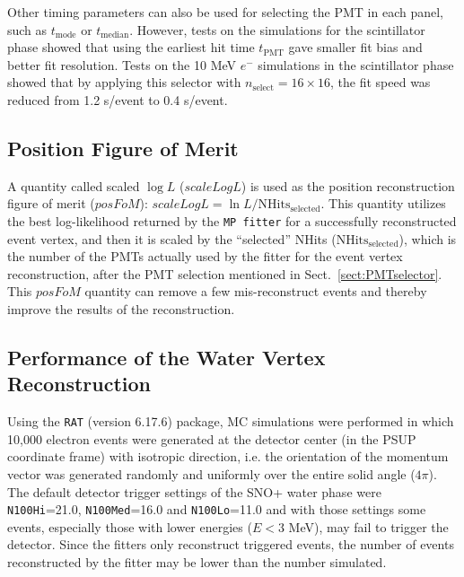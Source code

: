 \begin{itemize}
	Other timing parameters can also be used for selecting the PMT in each panel, such as $t_\mathrm{mode}$ or $t_\mathrm{median}$. However, tests on the simulations for the scintillator phase showed that using the earliest hit time $t_\mathrm{PMT}$ gave smaller fit bias and better fit resolution. Tests on the 10 MeV $e^-$ simulations in the scintillator phase showed that by applying this selector with $n_\mathrm{select}=16\times16$, the fit speed was reduced from 1.2 s/event to 0.4 s/event.
\end{itemize}

\subsection{Position Figure of Merit}\label{sect:positionFoM}

A quantity called scaled $\log L$ ($scaleLogL$) is used as the position reconstruction figure of merit ($posFoM$): $scaleLogL = \ln L/\mathrm{NHits}_\mathrm{selected}$. This quantity utilizes the best log-likelihood returned by the \texttt{MP fitter} for a successfully reconstructed event vertex, and then it is scaled by the ``selected'' NHits ($\mathrm{NHits}_\mathrm{selected}$), which is the number of the PMTs actually used by the fitter for the event vertex reconstruction, after the PMT selection mentioned in Sect.~\ref{sect:PMTselector}. This $posFoM$ quantity can remove a few mis-reconstruct events and thereby improve the results of the reconstruction.

\subsection{Performance of the Water Vertex Reconstruction}\label{sect:waterFitterVertex}

Using the \texttt{RAT} (version 6.17.6) package, MC simulations were performed in which 10,000 electron events were generated at the detector center (in the PSUP coordinate frame) with isotropic direction, i.e. the orientation of the momentum vector was generated randomly and uniformly over the entire solid angle ($4\pi$). The default detector trigger settings of the SNO+ water phase were \texttt{N100Hi}=21.0, \texttt{N100Med}=16.0 and \texttt{N100Lo}=11.0 and with those settings some events, especially those with lower energies ($E<3$ MeV), may fail to trigger the detector. Since the fitters only reconstruct triggered events, the number of events reconstructed by the fitter may be lower than the number simulated.

